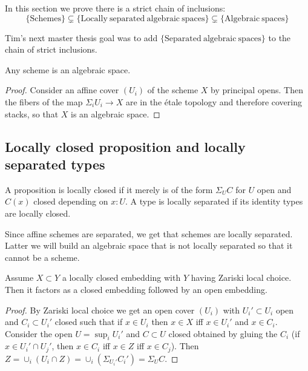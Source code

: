 In this section we prove there is a strict chain of inclusions:
\[\{\mathrm{Schemes}\} \subsetneq \{\mathrm{Locally\ separated\ algebraic\ spaces}\} \subsetneq \{\mathrm{Algebraic\ spaces}\}\]

Tim's next master thesis goal was to add $\{\mathrm{Separated\ algebraic\ spaces}\}$ to the chain of strict inclusions.

\begin{lemma}
Any scheme is an algebraic space.
\end{lemma}

\begin{proof}
Consider an affine cover $(U_i)$ of the scheme $X$ by principal opens. Then the fibers of the map $\Sigma_iU_i\to X$ are in the étale topology and therefore covering stacks, so that $X$ is an algebraic space.
\end{proof}


\subsection{Locally closed proposition and locally separated types}

\begin{definition}
A proposition is locally closed if it merely is of the form $\Sigma_UC$ for $U$ open and $C(x)$ closed depending on $x:U$. A type is locally separated if its identity types are locally closed. 
\end{definition}

Since affine schemes are separated, we get that schemes are locally separated. Latter we will build an algebraic space that is not locally separated so that it cannot be a scheme.

\begin{lemma}\label{factorisation-locally-closed-embedding}
Assume $X\subset Y$ a locally closed embedding with $Y$ having Zariski local choice. Then it factors as a closed embedding followed by an open embedding.
\end{lemma}

\begin{proof}
By Zariski local choice we get an open cover $(U_i)$ with $U_i'\subset U_i$ open and $C_i\subset U_i'$ closed such that if $x\in U_i$ then $x\in X$ iff $x\in U_i'$ and $x\in C_i$. Consider the open $U = \sup_iU_i'$ and $C\subset U$ closed obtained by gluing the $C_i$ (if $x\in U_i'\cap U_j'$, then $x\in C_i$ iff $x\in Z$ iff $x\in C_j$). Then $Z = \cup_i(U_i\cap Z) = \cup_i(\Sigma_{U_i'}C_i') = \Sigma_UC$. 
\end{proof}

